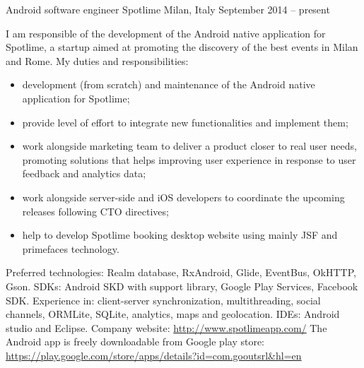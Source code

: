 \begin{cventries}
\cventry
{Android software engineer}
{Spotlime}
{Milan, Italy}
{September 2014 -- present}
{
   I am responsible of the 
   development of the 
   Android native application for 
   Spotlime, a startup aimed  at promoting  the 
   discovery of the best events in Milan and Rome. 
   My duties and responsibilities:
   \begin{itemize}
      \item development (from scratch) and maintenance of the Android native application
	 for Spotlime;
      \item provide level of effort to integrate new functionalities and
	 implement them;
      \item 
   work alongside marketing team to deliver a product closer
   to real user
   needs, promoting solutions that helps improving user experience in response
   to user feedback and analytics data;
      \item 
   work alongside server-side and iOS developers to coordinate the upcoming
   releases following CTO directives;
\item help to develop Spotlime booking desktop website using mainly JSF and
   primefaces technology.
\end{itemize}
Preferred technologies: Realm database, RxAndroid, Glide, EventBus, OkHTTP,
Gson.
SDKs: Android SKD with support library, Google Play Services, Facebook SDK.
   Experience in: client-server synchronization,  multithreading, 
   social channels,
   ORMLite, SQLite, 
   analytics, maps and geolocation. 
IDEs: Android studio and Eclipse. 
   Company website:
   \url{http://www.spotlimeapp.com/}
   The Android app is freely downloadable from Google play store: 
   \url{https://play.google.com/store/apps/details?id=com.gooutsrl&hl=en}
}


\end{cventries}
